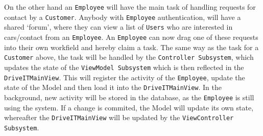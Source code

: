 On the other hand an \texttt{Employee} will have the main task of handling requests for contact by a \texttt{Customer}. Anybody with \texttt{Employee} authentication, will have a shared `forum', where they can view a list of \texttt{Users} who are interested in cars/contact from an \texttt{Employee}. An \texttt{Employee} can now drag one of these requests into their own workfield and hereby claim a task. The same way as the task for a \texttt{Customer} above, the task will be  handled by the \texttt{Controller Subsystem}, which updates the state of the \texttt{ViewModel Subsystem} which is then reflected in the \texttt{DriveITMainView}. This will register the activity of the \texttt{Employee}, update the state of the Model and then load it into the \texttt{DriveITMainView}. In the background, new activity will be stored in the database, as the \texttt{Employee} is still using the system. If a change is commited, the Model will update its own state, whereafter the \texttt{DriveITMainView} will be updated by the  \texttt{ViewController Subsystem}.\\